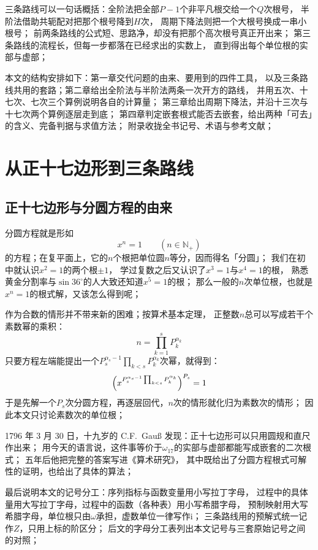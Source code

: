 \documentclass[UTF8,a4paper,11pt]{ctexart}
\newcommand{\ii}{\mathrm{i}}
\newcommand{\NN}{\mathbb N}
\begin{document}
三条路线可以一句话概括：全阶法把全部$P-1$个非平凡根交给一个$Q$次根号，
半阶法借助共轭配对把那个根号降到$H$次，
周期下降法则把一个大根号换成一串小根号；
前两条路线的公式短、思路净，却没有把那个高次根号真正开出来；
第三条路线的流程长，但每一步都落在已经求出的实数上，
直到得出每个单位根的实部与虚部；\par

本文的结构安排如下：第一章交代问题的由来、要用到的四件工具，
以及三条路线共用的套路；第二章给出全阶法与半阶法两条一次开方的路线，
并用五次、十七次、七次三个算例说明各自的计算量；
第三章给出周期下降法，并沿十三次与十七次两个算例逐层走到底；
第四章判定嵌套根式能否去嵌套，给出两种「可去」的含义、完备判据与求值方法；
附录收拢全书记号、术语与参考文献；\par


\section{从正十七边形到三条路线}
\subsection{正十七边形与分圆方程的由来}
分圆方程就是形如
\[
 x^{n}=1\qquad(n\in\NN_{+})
\]
的方程；在复平面上，它的$n$个根把单位圆$n$等分，因而得名「分圆」；
我们在初中就认识$x^{2}=1$的两个根$\pm1$，
学过复数之后又认识了$x^{3}=1$与$x^{4}=1$的根，
熟悉黄金分割率与$\sin36^{\circ}$的人大致还知道$x^{5}=1$的根；
那么一般的$n$次单位根，也就是$x^{n}=1$的根式解，又该怎么得到呢；

作为合数的情形并不带来新的困难；按算术基本定理，
正整数$n$总可以写成若干个素数幂的乘积：
\[
 n=\prod_{k=1}^{s}P_k^{\alpha_k}
\]
只要方程左端能提出一个$P_s^{\alpha_s-1}\prod_{k<s}P_k^{\alpha_k}$次幂，就得到：
\[
 \Bigl(x^{P_s^{\alpha_s-1}\prod_{k<s}P_k^{\alpha_k}}\Bigr)^{P_s}=1
\]
于是先解一个$P_s$次分圆方程，再逐层回代，$n$次的情形就化归为素数次的情形；
因此本文只讨论素数次的单位根；\par

1796 年 3 月 30 日，十九岁的 C.F.\ Gauß 发现：正十七边形可以只用圆规和直尺作出来；
用今天的语言说，这件事等价于$\omega_{17}$的实部与虚部都能写成嵌套的二次根式；
五年后他把完整的答案写进《算术研究》，
其中既给出了分圆方程根式可解性的证明，也给出了具体的算法；\par


最后说明本文的记号分工：序列指标与函数变量用小写拉丁字母，
过程中的具体量用大写拉丁字母，过程中的函数（各种表）用小写希腊字母，
预制映射用大写希腊字母，单位根只由$\omega$承担，虚数单位一律写作$\ii$；
三条路线用的预解式统一记作$Z$，只用上标的阶区分；
后文的字母分工表列出本文记号与三套原始记号之间的对照；
\end{document}
